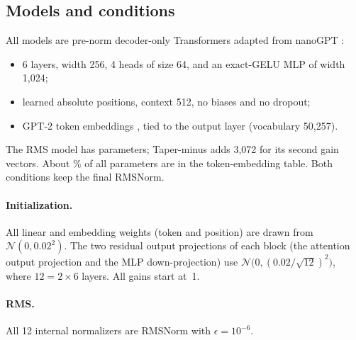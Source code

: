 \documentclass[11pt]{article}
\begin{document}
\subsection{Models and conditions}

All models are pre-norm decoder-only Transformers adapted from nanoGPT \citep{karpathy2022nanogpt}:
\begin{itemize}[leftmargin=1.4em,itemsep=1pt]
  \item 6 layers, width 256, 4 heads of size 64, and an exact-GELU MLP of width 1{,}024;
  \item learned absolute positions, context 512, no biases and no dropout;
  \item GPT-2 token embeddings \citep{radford2019gpt2}, tied to the output layer (vocabulary 50{,}257).
\end{itemize}
The RMS model has \paramsRMS{} parameters; Taper-minus adds 3{,}072 for its second gain vectors. About
\embedShare\% of all parameters are in the token-embedding table. Both conditions keep the final RMSNorm.

\paragraph{Initialization.} All linear and embedding weights (token and position) are drawn from
$\mathcal{N}(0, 0.02^2)$. The two residual output projections of each block (the attention output projection and
the MLP down-projection) use $\mathcal{N}\big(0, (0.02/\sqrt{12})^2\big)$, where $12 = 2 \times 6$ layers. All gains
start at~1.

\paragraph{RMS.} All 12 internal normalizers are RMSNorm with $\epsilon = 10^{-6}$.
\end{document}
